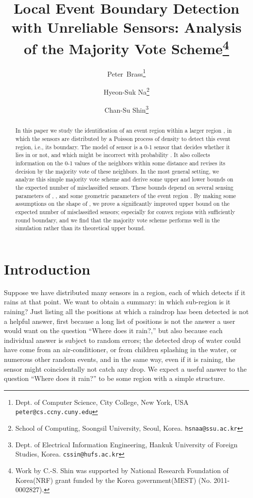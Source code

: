 \documentclass{article}
\begin{document}
\title{
Local Event Boundary Detection with Unreliable Sensors:
Analysis of the Majority Vote Scheme\thanks{Work by C.-S. Shin was supported by National Research Foundation of Korea(NRF) grant funded by the Korea government(MEST) (No. 2011-0002827).}}


\author{
	Peter~Brass\thanks{Dept. of Computer Science, City College, New York, USA \tt{peter@cs.ccny.cuny.edu}} \and 
	Hyeon-Suk Na\thanks{School of Computing, Soongsil University, Seoul, Korea. \tt{hsnaa@ssu.ac.kr}} 
	\and Chan-Su Shin\thanks{Dept. of Electrical Information Engineering, Hankuk University of Foreign Studies, Korea. \tt{cssin@hufs.ac.kr}}
}
\date{}
\maketitle

\begin{abstract}
In this paper we study the identification of an event region  within a
larger region , in which the sensors are distributed by a Poisson process
of density  to detect this event region, i.e., its boundary. The model of sensor is a 0-1
sensor that decides whether it lies in  or not, and which might be
incorrect with probability . It also collects information on the
0-1 values of the neighbors within some distance  and revises its
decision by the majority vote of these neighbors. In the most general setting, we analyze this simple majority vote scheme
and derive some upper and lower bounds on the expected number of misclassified
sensors. These bounds depend on several sensing parameters of , , and some geometric parameters of the event region . By making some assumptions on the shape of , we prove a significantly improved upper bound on the expected number of misclassified sensors; especially for convex regions with sufficiently round boundary, and we find that the majority vote scheme performs well in the simulation rather than its theoretical upper bound.
\end{abstract}




\section{Introduction}
Suppose we have distributed many sensors in a region, each of which detects
if it rains at that point. We want to obtain a summary: in which sub-region
is it raining? Just listing all the positions at which a raindrop has been
detected is not a helpful answer, first because a long list of positions
is not the answer a user would want on the question ``Where does it rain?,''
but also because each individual answer is subject to random
errors; the detected drop of water could have come from an air-conditioner,
or from children splashing in the water, or numerous other random events,
and in the same way, even if it is raining, the sensor might coincidentally
not catch any drop. We expect a useful answer to the question ``Where does it rain?'' to be some region with a simple structure.
\end{document}
